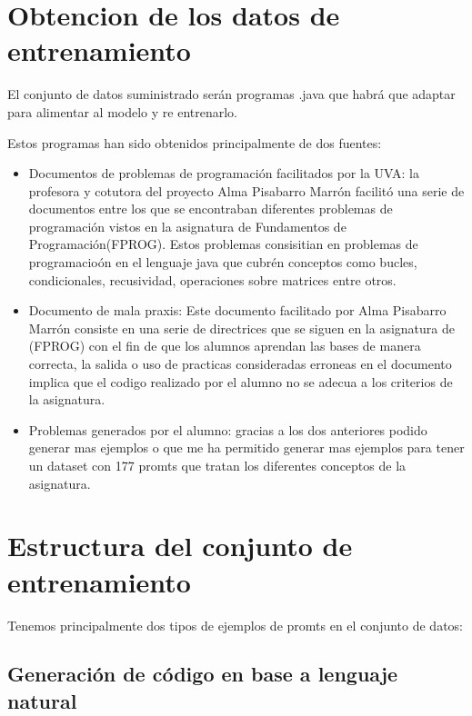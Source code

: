 
\section{Obtencion de los datos de entrenamiento}

El conjunto de datos suministrado serán programas .java que habrá que adaptar para alimentar al modelo y re entrenarlo.

Estos programas han sido obtenidos principalmente de dos fuentes:

\begin{itemize}
    \item Documentos de problemas de programación facilitados por la UVA: la profesora y cotutora del proyecto Alma Pisabarro Marrón facilitó una serie de documentos entre los que se encontraban diferentes problemas de programación vistos en la asignatura de Fundamentos de Programación(FPROG). Estos problemas consisitian en problemas de programacioón en el lenguaje java que cubrén conceptos como bucles, condicionales, recusividad, operaciones sobre matrices entre otros.
    
    \item Documento de mala praxis: Este documento facilitado por Alma Pisabarro Marrón consiste en una serie de directrices que se siguen en la asignatura de (FPROG) con el fin de que los alumnos aprendan las bases de manera correcta, la salida o uso de practicas consideradas erroneas en el documento implica que el codigo realizado por el alumno no se adecua a los criterios de la asignatura.

    \item Problemas generados por el alumno: gracias a los dos anteriores podido generar mas ejemplos o que me ha permitido generar mas ejemplos para tener un dataset con 177 promts que tratan los diferentes conceptos de la asignatura.
\end{itemize}

\section{Estructura del conjunto de entrenamiento}

Tenemos principalmente dos tipos de ejemplos de promts en el conjunto de datos:

\subsection{Generación de código en base a lenguaje natural}

